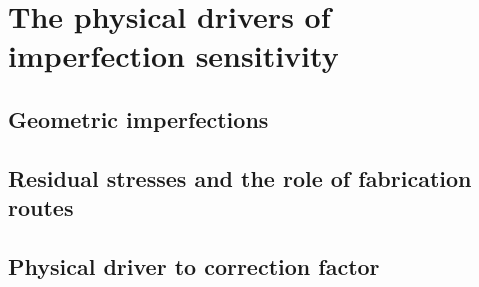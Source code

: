 
\section{The physical drivers of imperfection sensitivity}
\label{sec:imperfection-drivers}

\subsection{Geometric imperfections}
\subsection{Residual stresses and the role of fabrication routes}
\subsection{Physical driver to correction factor}

